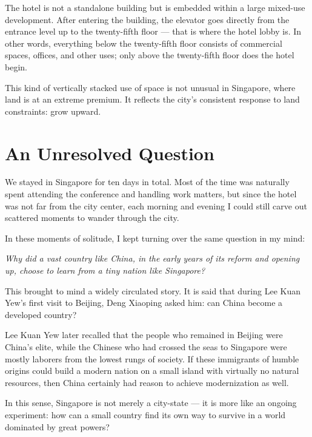 The hotel is not a standalone building but is embedded within a large mixed-use development. After entering the building, the elevator goes directly from the entrance level up to the twenty-fifth floor --- that is where the hotel lobby is. In other words, everything below the twenty-fifth floor consists of commercial spaces, offices, and other uses; only above the twenty-fifth floor does the hotel begin.

This kind of vertically stacked use of space is not unusual in Singapore, where land is at an extreme premium. It reflects the city's consistent response to land constraints: grow upward.

\section{An Unresolved Question}

We stayed in Singapore for ten days in total. Most of the time was naturally spent attending the conference and handling work matters, but since the hotel was not far from the city center, each morning and evening I could still carve out scattered moments to wander through the city.

In these moments of solitude, I kept turning over the same question in my mind:

\begin{center}
\textit{Why did a vast country like China, in the early years of its reform and opening up, choose to learn from a tiny nation like Singapore?}
\end{center}

This brought to mind a widely circulated story. It is said that during Lee Kuan Yew's first visit to Beijing, Deng Xiaoping asked him: can China become a developed country?

Lee Kuan Yew later recalled that the people who remained in Beijing were China's elite, while the Chinese who had crossed the seas to Singapore were mostly laborers from the lowest rungs of society. If these immigrants of humble origins could build a modern nation on a small island with virtually no natural resources, then China certainly had reason to achieve modernization as well.

In this sense, Singapore is not merely a city-state --- it is more like an ongoing experiment: how can a small country find its own way to survive in a world dominated by great powers?

